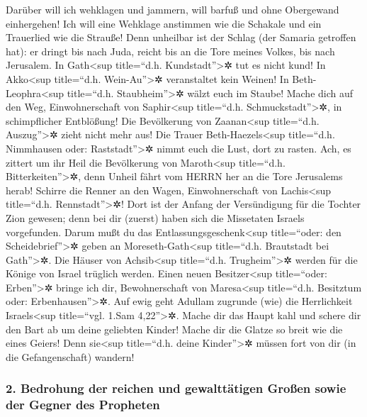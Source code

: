  Darüber will ich wehklagen und jammern, will barfuß und
ohne Obergewand einhergehen! Ich will eine Wehklage anstimmen wie die
Schakale und ein Trauerlied wie die Strauße!  Denn
unheilbar ist der Schlag (der Samaria getroffen hat): er dringt bis nach
Juda, reicht bis an die Tore meines Volkes, bis nach Jerusalem.
 In Gath\textless sup title=``d.h.
Kundstadt''\textgreater✲ tut es nicht kund! In Akko\textless sup
title=``d.h. Wein-Au''\textgreater✲ veranstaltet kein Weinen! In
Beth-Leophra\textless sup title=``d.h. Staubheim''\textgreater✲ wälzt
euch im Staube!  Mache dich auf den Weg, Einwohnerschaft
von Saphir\textless sup title=``d.h. Schmuckstadt''\textgreater✲, in
schimpflicher Entblößung! Die Bevölkerung von Zaanan\textless sup
title=``d.h. Auszug''\textgreater✲ zieht nicht mehr aus! Die Trauer
Beth-Haezels\textless sup title=``d.h. Nimmhausen oder:
Raststadt''\textgreater✲ nimmt euch die Lust, dort zu rasten.
 Ach, es zittert um ihr Heil die Bevölkerung von
Maroth\textless sup title=``d.h. Bitterkeiten''\textgreater✲, denn
Unheil fährt vom HERRN her an die Tore Jerusalems herab! 
Schirre die Renner an den Wagen, Einwohnerschaft von Lachis\textless sup
title=``d.h. Rennstadt''\textgreater✲! Dort ist der Anfang der
Versündigung für die Tochter Zion gewesen; denn bei dir (zuerst) haben
sich die Missetaten Israels vorgefunden.  Darum mußt du
das Entlassungsgeschenk\textless sup title=``oder: den
Scheidebrief''\textgreater✲ geben an Moreseth-Gath\textless sup
title=``d.h. Brautstadt bei Gath''\textgreater✲. Die Häuser von
Achsib\textless sup title=``d.h. Trugheim''\textgreater✲ werden für die
Könige von Israel trüglich werden.  Einen neuen
Besitzer\textless sup title=``oder: Erben''\textgreater✲ bringe ich dir,
Bewohnerschaft von Maresa\textless sup title=``d.h. Besitztum oder:
Erbenhausen''\textgreater✲. Auf ewig geht Adullam zugrunde (wie) die
Herrlichkeit Israels\textless sup title=``vgl. 1.Sam
4,22''\textgreater✲.  Mache dir das Haupt kahl und schere
dir den Bart ab um deine geliebten Kinder! Mache dir die Glatze so breit
wie die eines Geiers! Denn sie\textless sup title=``d.h. deine
Kinder''\textgreater✲ müssen fort von dir (in die Gefangenschaft)
wandern!

\hypertarget{bedrohung-der-reichen-und-gewalttuxe4tigen-grouxdfen-sowie-der-gegner-des-propheten}{%
\subsubsection{2. Bedrohung der reichen und gewalttätigen Großen sowie
der Gegner des
Propheten}\label{bedrohung-der-reichen-und-gewalttuxe4tigen-grouxdfen-sowie-der-gegner-des-propheten}}

